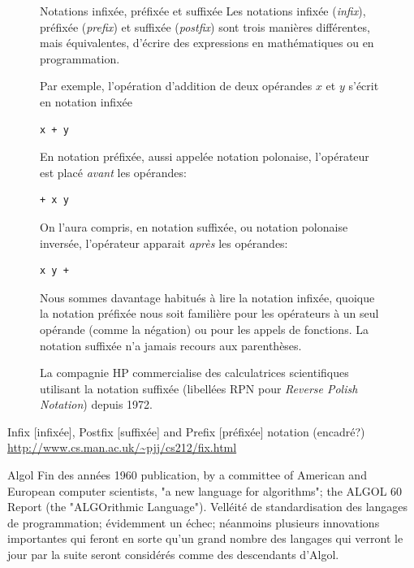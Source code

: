 \begin{figure}[t]
  \setlength{\FrameRule}{1pt}
  \begin{emphbox}{\mdseries Notations infixée, préfixée et suffixée}
    Les notations infixée (\emph{infix}), préfixée (\emph{prefix}) et
    suffixée (\emph{postfix}) sont trois manières différentes, mais
    équivalentes, d'écrire des expressions en mathématiques ou en
    programmation.

    Par exemple, l'opération d'addition de deux opérandes $x$ et $y$
    s'écrit en notation infixée
\begin{lstlisting}[backgroundcolor=\color{codebg}]
x + y
\end{lstlisting}
    En notation préfixée, aussi appelée notation polonaise,
    l'opérateur est placé \emph{avant} les opérandes:
\begin{lstlisting}[backgroundcolor=\color{codebg}]
+ x y
\end{lstlisting}
    On l'aura compris, en notation suffixée, ou notation polonaise
    inversée, l'opérateur apparait \emph{après} les opérandes:
\begin{lstlisting}[backgroundcolor=\color{codebg}]
x y +
\end{lstlisting}
    Nous sommes davantage habitués à lire la notation infixée, quoique
    la notation préfixée nous soit familière pour les opérateurs à un
    seul opérande (comme la négation) ou pour les appels de fonctions.
    La notation suffixée n'a jamais recours aux parenthèses.

    La compagnie HP commercialise des calculatrices scientifiques
    utilisant la notation suffixée (libellées RPN pour \emph{Reverse
      Polish Notation}) depuis 1972.
  \end{emphbox}
\end{figure}

Infix [infixée], Postfix [suffixée] and Prefix [préfixée] notation (encadré?)
\url{http://www.cs.man.ac.uk/~pjj/cs212/fix.html}


Algol Fin des années 1960 publication, by a committee of American and
European computer scientists, "a new language for algorithms"; the
ALGOL 60 Report (the "ALGOrithmic Language"). Velléité de
standardisation des langages de programmation; évidemment un échec;
néanmoins plusieurs innovations importantes qui feront en sorte qu'un
grand nombre des langages qui verront le jour par la suite seront
considérés comme des descendants d'Algol.

